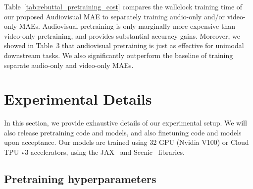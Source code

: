 \documentclass[10pt,twocolumn,letterpaper]{article}
\begin{document}
\begin{table}[t]
	\caption{
		Pretraining time analysis on VGGSound, using identical hardware.
		We also report audiovisual finetuning accuracy.
	}
	\renewcommand{\arraystretch}{0.8}
	\label{tab:rebuttal_pretraining_cost}
\end{table}

 
Table~\ref{tab:rebuttal_pretraining_cost} compares the wallclock training time of our proposed Audiovisual MAE to separately training audio-only and/or video-only MAEs.
Audiovisual pretraining is only marginally more expensive than video-only pretraining, and provides substantial accuracy gains.
Moreover, we showed in Table~3 that audiovisual pretraining is just as effective for unimodal downstream tasks.
We also significantly outperform the baseline of training separate audio-only and video-only MAEs.

 \section{Experimental Details}
\label{sec:supp_exp_details}

In this section, we provide exhaustive details of our experimental setup.
We will also release pretraining code and models, and also finetuning code and models upon acceptance.
Our models are trained using 32 GPU (Nvidia V100) or Cloud TPU v3 accelerators, using the JAX~\cite{jax2018github} and Scenic~\cite{dehghani2021scenic} libraries.

\subsection{Pretraining hyperparameters}
\end{document}
